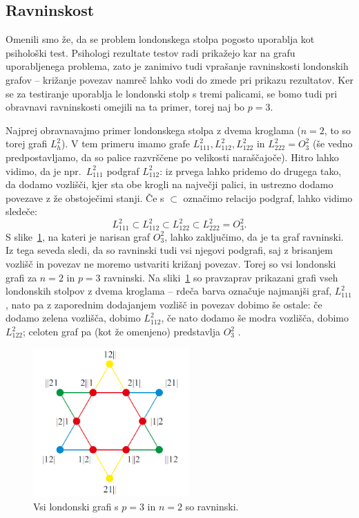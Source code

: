 \documentclass[12pt,a4paper]{amsart}
\theoremstyle{definition} %
\theoremstyle{plain} %
\begin{document}
\subsection{Ravninskost}

Omenili smo že, da se problem londonskega stolpa pogosto uporablja kot psihološki test. Psihologi rezultate testov radi prikažejo kar na grafu uporabljenega problema, zato je zanimivo tudi vprašanje ravninskosti londonskih grafov -- križanje povezav namreč lahko vodi do zmede pri prikazu rezultatov. Ker se za testiranje uporablja le londonski stolp s tremi palicami, se bomo tudi pri obravnavi ravninskosti omejili na ta primer, torej naj bo $p=3$.

Najprej obravnavajmo primer londonskega stolpa z dvema kroglama ($n=2$, to so torej grafi $L^2_h$). V tem primeru imamo grafe 
$L^2_{111}, L^2_{112}, L^2_{122}$ in $L^2_{222} = O^2_3$ (še vedno predpostavljamo, da so palice razvrščene po velikosti naraščajoče). Hitro lahko vidimo, da je npr.\ $L^2_{111}$ podgraf $L^2_{112}$: iz prvega lahko pridemo do drugega tako, da dodamo vozlišči, kjer sta obe krogli na največji palici, in ustrezno dodamo povezave z že obstoječimi stanji. Če s $ \subset $ označimo relacijo podgraf, lahko vidimo sledeče:
\[ L^2_{111} \subset L^2_{112} \subset L^2_{122} \subset L^2_{222} = O^2_3 .\]
S slike~\ref{fig:graf-2krogli}, na kateri je narisan graf $O^2_3$, lahko zaključimo, da je ta graf ravninski. Iz tega seveda sledi, da so ravninski tudi vsi njegovi podgrafi, saj z brisanjem vozlišč in povezav ne moremo ustvariti križanj povezav. Torej so vsi londonski grafi za $n=2$ in $p=3$ ravninski.
Na sliki~\ref{fig:graf-2krogli} so pravzaprav prikazani grafi vseh londonskih stolpov z dvema kroglama -- rdeča barva označuje najmanjši graf, $L^2_{111}$, nato pa z zaporednim dodajanjem vozlišč in povezav dobimo še ostale: če dodamo zelena vozlišča, dobimo $L^2_{112}$, če nato dodamo še modra vozlišča, dobimo $L^2_{122}$; celoten graf pa (kot že omenjeno) predstavlja $O^2_3$ .

\begin{figure}[h]
    \includegraphics[width=170pt]{img/tolgraph-2balls.png}
    \caption{Vsi londonski grafi s $p=3$ in $n=2$ so ravninski.}
    \label{fig:graf-2krogli}
\end{figure}
\end{document}
